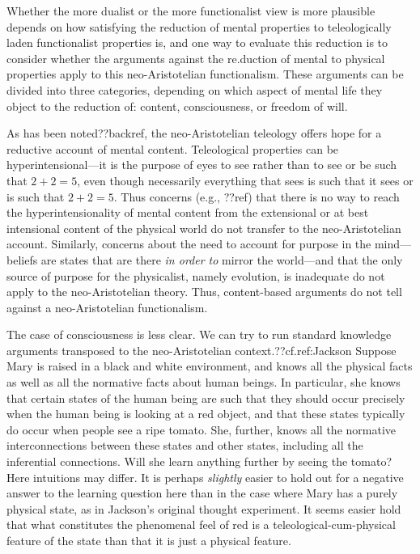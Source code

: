 Whether the more dualist or the more functionalist view is more plausible depends on how satisfying the reduction of mental
properties to teleologically laden functionalist properties is, and one way to evaluate this reduction is to consider
whether the arguments against the re.duction of mental to physical properties apply to this neo-Aristotelian functionalism.
These arguments can be divided into three categories, depending on which aspect of mental life they object to the reduction
of: content, consciousness, or freedom of will. 

As has been noted??backref, the neo-Aristotelian teleology offers hope for a reductive account of mental content. Teleological properties
can be hyperintensional---it is the purpose of eyes to see rather than to see or be such that $2+2=5$, even though necessarily
everything that sees is such that it sees or is such that $2+2=5$. Thus concerns (e.g., ??ref) that there is no way to reach the hyperintensionality
of mental content from the extensional or at best intensional content of the physical world do not transfer to the neo-Aristotelian
account. Similarly, concerns about the need to account for purpose in the mind---beliefs are states that are there 
\textit{in order to} mirror the world---and that the only source of purpose for the physicalist, namely evolution, is inadequate
do not apply to the neo-Aristotelian theory. Thus, content-based arguments do not tell against a neo-Aristotelian functionalism.

The case of consciousness is less clear. We can try to run standard knowledge arguments transposed to the neo-Aristotelian context.??cf.ref:Jackson
Suppose Mary is raised in a black and white environment, and knows all the physical facts as well as all the normative facts about
human beings. In particular, she knows that certain states of the human being are such that they should occur precisely when the
human being is looking at a red object, and that these states typically do occur when people see a ripe tomato. She, further, knows all
the normative interconnections between these states and other states, including all the inferential connections. Will she learn anything
further by seeing the tomato? Here intuitions may differ. It is perhaps \textit{slightly} easier to hold out for a negative answer to the learning question
here than in the case where Mary has a purely physical state, as in Jackson's original thought experiment. It seems
easier hold that what constitutes the phenomenal feel of red is a teleological-cum-physical feature of the state
than that it is just a physical feature.

